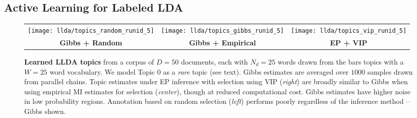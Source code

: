 \subsection{Active Learning for Labeled LDA}\label{sec:llda}

    

\begin{figure*}
  \begin{tabular}{ccc}
    \hspace{-3mm}\texttt{[image: llda/topics\_random\_runid\_5]} &
    \texttt{[image: llda/topics\_gibbs\_runid\_5]} &
    \texttt{[image: llda/topics\_vip\_runid\_5]} \vspace{-3mm}\\
    {\small\textbf{Gibbs + Random}} & {\small\textbf{Gibbs +
        Empirical}} & {\small\textbf{EP + VIP}}
  \end{tabular}

  \caption{\small \textbf{Learned LLDA topics} from a corpus of $D=50$
    documents, each with $N_d=25$ words drawn from the bars topics
    with a $W=25$ word vocabulary.  We model Topic 0 as a \emph{rare}
    topic (see text).  Gibbs estimates are averaged over $1000$
    samples drawn from parallel chains.  Topic estimates under EP
    inference with selection using VIP (\emph{right}) are broadly
    similar to Gibbs when using empirical MI estimates for selection
    (\emph{center}), though at reduced computational cost.  Gibbs
    estimates have higher noise in low probability regions.
    Annotation based on random selection (\emph{left}) performs poorly
    regardless of the inference method -- Gibbs shown.}

  \label{fig:llda_topics}
\end{figure*}


